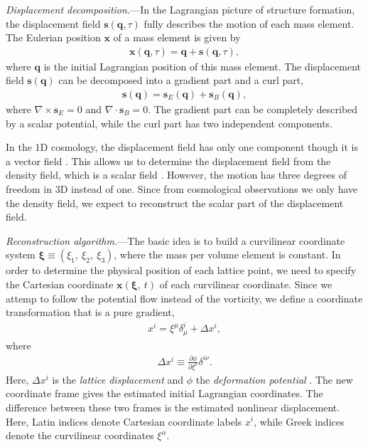 \documentclass[aps,prd,twocolumn,showpacs,superscriptaddress,groupedaddress,nofootinbib]{revtex4}  %
\newcommand{\bea}{\begin{eqnarray}}
\newcommand{\eea}{\end{eqnarray}}
\begin{document}

{\it Displacement decomposition.}---In the Lagrangian picture of structure 
formation, 
the displacement field $\bm{s}(\bm{q},\tau)$ fully describes the motion of each mass element. The Eulerian position $\bm{x}$ of a mass element is given by
\bea
\bm{x}(\bm{q},\tau)=\bm{q}+\bm{s}(\bm{q},\tau),
\eea
where $\bm{q}$ is the initial Lagrangian position of this mass element.
The displacement field $\bm{s}(\bm{q})$ can be decomposed into a gradient part
and a curl part,
\bea
\bm{s}(\bm{q})=\bm{s}_E(\bm{q})+\bm{s}_B(\bm{q}),
\eea
where $\nabla\times\bm{s}_E=0$ and $\nabla\cdot\bm{s}_B=0$.
The gradient part can be completely described by a scalar potential,
while the curl part has two independent components.

In the 1D cosmology, the displacement field has only one component though 
it is a vector field \cite{2016matt}. 
This allows us to determine the displacement field 
from the density field, which is a scalar field \cite{2016arXiv160907041Z}.
However, the motion has three degrees of freedom in 3D instead of one.
Since from cosmological observations we only have the density field, we expect 
to reconstruct the scalar part of the displacement field.


{\it Reconstruction algorithm.}---The basic idea is to build a curvilinear 
coordinate system $\bm{\xi}\equiv(\xi_1,\ \xi_2,\ \xi_3)$, where the mass per
volume element is constant. 
In order to determine the physical position of each lattice point, we need to 
specify the Cartesian coordinate $\bm{x}(\bm{\xi},\ t)$ of each curvilinear 
coordinate.
Since we attemp to follow the potential flow instead of the vorticity, we 
define a coordinate transformation that is a pure gradient,
\bea
\label{eq:trs}
x^i=\xi^\mu\delta^i_\mu+\Delta x^i,
\eea
where
\bea
\Delta x^i\equiv\frac{\partial\phi}{\partial\xi^\nu}\delta^{i\nu}.
\eea
Here, $\Delta{x}^i$ is the {\it lattice displacement} and $\phi$ the 
{\it deformation potential} \cite{1995ApJS..100..269P,1998ApJS..115...19P}. 
The new coordinate frame gives the estimated initial Lagrangian coordinates. 
The difference between these two frames is the estimated nonlinear displacement.
Here, Latin indices denote Cartesian coordinate labels $x^i$, while Greek 
indices denote the curvilinear coordinates $\xi^\alpha$.
\end{document}

